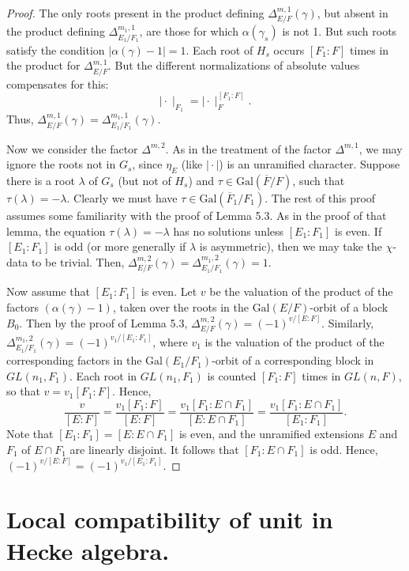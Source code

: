 \documentclass{amsart}
\begin{document}
\begin{proof}
The only roots present in the product defining $\Delta^{m,1}_{E/F}(\gamma)$,
but absent in the product defining $\Delta^{m_1,1}_{E_1/F_1}$, are those
for which $\alpha(\gamma_s)$ is not 1.  But such roots satisfy the condition
$|\alpha(\gamma)-1| = 1$.  Each root of $H_s$ occurs $[F_1:F]$
times in the product for $\Delta^{m,1}_{E/F}$.  But the different
normalizations of absolute values compensates for this:
$$\mid\cdot\mid_{F_1} = \mid\cdot\mid_{F}^{[F_1:F]}.$$
Thus, $\Delta^{m,1}_{E/F}(\gamma) = \Delta^{m_1,1}_{E_1/F_1}(\gamma)$.

Now we consider the factor $\Delta^{m,2}$.  As in the treatment
of the factor $\Delta^{m,1}$, we may ignore the roots not
in $G_s$, since $\eta_E$ (like $\mid\cdot\mid$) is an unramified
character.  Suppose there is a root $\lambda$ of $G_s$ (but not of $H_s$)
and $\tau\in \text{Gal}(\overline F/F)$, 
such that $\tau(\lambda) = -\lambda$.  Clearly
we must have $\tau\in\text{Gal}(\overline F_1/F_1)$.  The rest
of this proof assumes some familiarity with the proof of Lemma 5.3.
As in the proof of that lemma,
the equation $\tau(\lambda) =-\lambda$ has no solutions
unless $[E_1:F_1]$ is even.  If $[E_1:F_1]$ is odd (or more generally if
$\lambda$ is asymmetric), then we may take the $\chi$-data to be trivial.
Then, $\Delta^{m,2}_{E/F}(\gamma) = \Delta^{m_1,2}_{E_1/F_1}(\gamma) = 1$.

Now assume that $[E_1:F_1]$ is even.  Let $v$ be the valuation of
the product of the factors $(\alpha(\gamma)-1)$, taken over the
roots in the $\text{Gal}(E/F)$-orbit of a block $B_0$.  Then by the
proof of Lemma 5.3, $\Delta^{m,2}_{E/F}(\gamma) = (-1)^{v/[E:F]}$.
Similarly, $\Delta^{m_1,2}_{E_1/F_1}(\gamma) = (-1)^{v_1/[E_1:F_1]}$,
where $v_1$ is the valuation of the product of the corresponding
factors in the $\text{Gal}(E_1/F_1)$-orbit of a corresponding
block in $GL(n_1,F_1)$.  Each root in $GL(n_1,F_1)$ is counted
$[F_1:F]$ times in $GL(n,F)$, so that $v=v_1[F_1:F]$.
Hence,
$$\frac v {[E:F]} = \frac {v_1[F_1:F]}{[E:F]} =
   \frac {v_1[F_1:E\cap F_1]}{[E:E\cap F_1]} =
   \frac {v_1[F_1:E\cap F_1]}{[E_1:F_1]}.$$
Note that $[E_1:F_1]=[E:E\cap F_1]$  is even, and the unramified
extensions $E$ and $F_1$ of $E\cap F_1$ are linearly disjoint.
It follows that $[F_1:E\cap F_1]$ is odd.  Hence,
$(-1)^{v/[E:F]} = (-1)^{v_1/[E_1:F_1]}$.
\end{proof}

\section{{Local compatibility of unit in Hecke algebra.}}
\end{document}
